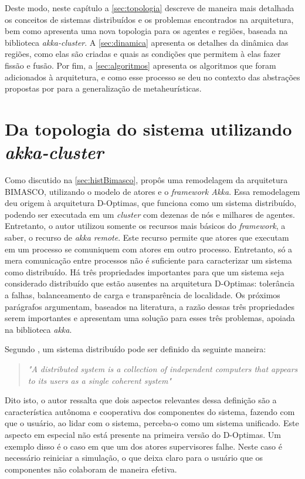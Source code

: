 Deste modo, neste capítulo a \autoref{sec:topologia} descreve de maneira mais detalhada os conceitos de sistemas distribuídos e os problemas encontrados na arquitetura, bem como apresenta uma nova topologia para os agentes e regiões, baseada na biblioteca \textit{akka-cluster}. A \autoref{sec:dinamica} apresenta os detalhes da dinâmica das regiões, como elas são criadas e quais as condições que permitem à elas fazer fissão e fusão. Por fim, a \autoref{sec:algoritmos} apresenta os algoritmos que foram adicionados à arquitetura, e como esse processo se deu no contexto das abstrações propostas por  para a generalização de metaheurísticas.

\section{Da topologia do sistema utilizando \textit{akka-cluster}}
\label{sec:topologia}
Como discutido na \autoref{sec:histBimasco},  propôs uma remodelagem da arquitetura BIMASCO, utilizando o modelo de atores e o \textit{framework Akka}. Essa remodelagem deu origem à arquitetura D-Optimas, que funciona como um sistema distribuído, podendo ser executada em um \textit{cluster} com dezenas de nós e milhares de agentes. Entretanto, o autor utilizou somente os recursos mais básicos do \textit{framework}, a saber, o recurso de \textit{akka remote}. Este recurso permite que atores que executam em um processo se comuniquem com atores em outro processo.  Entretanto, só a mera comunicação entre processos não é suficiente para caracterizar um sistema como distribuído. Há três propriedades importantes para que um sistema seja considerado distribuído que estão ausentes na arquitetura D-Optimas: tolerância a falhas, balanceamento de carga e transparência de localidade. Os próximos parágrafos argumentam, baseados na literatura, a razão dessas três propriedades serem importantes e apresentam uma solução para esses três problemas, apoiada na biblioteca \textit{akka}.

Segundo , um sistema distribuído pode ser definido da seguinte maneira:

\begin{quote}
\textit{"A distributed system is a collection of independent computers that appears to its users as a single coherent system"} \cite[p. 2]{tanenbaum}
\end{quote}

Dito isto, o autor ressalta que dois aspectos relevantes dessa definição são a característica autônoma e cooperativa dos componentes do sistema, fazendo com que o usuário, ao lidar com o sistema, perceba-o como um sistema unificado. Este aspecto em especial não está presente na primeira versão do D-Optimas. Um exemplo disso é o caso em que um dos atores supervisores falhe. Neste caso é necessário reiniciar a simulação, o que deixa claro para o usuário que os componentes não colaboram de maneira efetiva. 

